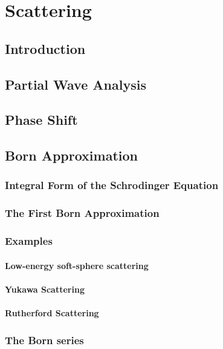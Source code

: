 \chapter{Scattering}
\section{Introduction}
\section{Partial Wave Analysis}
\section{Phase Shift}
\section{Born Approximation}
\subsection{Integral Form of the Schrodinger Equation}
\subsection{The First Born Approximation}
\subsection{Examples}
\subsubsection{Low-energy soft-sphere scattering}
\subsubsection{Yukawa Scattering}
\subsubsection{Rutherford Scattering}

\subsection{The Born series}

